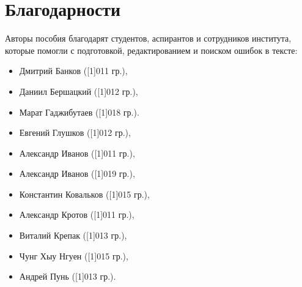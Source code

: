 \section*{Благодарности}
Авторы пособия благодарят студентов, аспирантов и сотрудников института, которые помогли с подготовкой, редактированием и поиском ошибок в тексте:

\begin{itemize}
	\item Дмитрий Банков ([1]011 гр.),
	\item Даниил Бершацкий ([1]012 гр.),
	\item Марат Гаджибутаев ([1]018 гр.).
	\item Евгений Глушков ([1]012 гр.),
	\item Александр Иванов ([1]011 гр.),
	\item Александр Иванов ([1]019 гр.),
	\item Константин Ковальков ([1]015 гр.),
	\item Александр Кротов ([1]011 гр.),
	\item Виталий Крепак ([1]013 гр.),
	\item Чунг Хыу Нгуен ([1]015 гр.),
	\item Андрей Пунь ([1]013 гр.).
\end{itemize}

